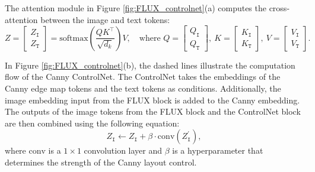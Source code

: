 \documentclass{article}
\begin{document}
The attention module in Figure \ref{fig:FLUX_controlnet}(a) computes the cross-attention between the image and text tokens:
\begin{equation}
Z = \begin{bmatrix} Z_\texttt{I}\\Z_\texttt{T}\end{bmatrix} = \mathrm{softmax}\left(\frac{Q K^\top}{\sqrt{d_k}}\right)V,\quad \text{where }
Q = \begin{bmatrix}Q_\texttt{I}\\Q_\texttt{T}\end{bmatrix},\ 
K = \begin{bmatrix}K_\texttt{I}\\K_\texttt{T}\end{bmatrix},\ 
V = \begin{bmatrix}V_\texttt{I}\\V_\texttt{T}\end{bmatrix}.\ 
\label{eq:FLUX_attention}
\end{equation}

In Figure \ref{fig:FLUX_controlnet}(b), the dashed lines illustrate the computation flow of the Canny ControlNet. The ControlNet takes the embeddings of the Canny edge map tokens and the text tokens as conditions. Additionally, the image embedding input from the FLUX block is added to the Canny embedding. The outputs of the image tokens from the FLUX block and the ControlNet block are then combined using the following equation:
\begin{equation}
Z_{\texttt{I}} \gets Z_{\texttt{I}} + \beta \cdot \mathrm{conv}(Z^{\prime}_{\texttt{I}}),
\label{eq:controlnet_add}
\end{equation}
where $\mathrm{conv}$ is a $1\times1$ convolution layer and $\beta$ is a hyperparameter that determines the strength of the Canny layout control.
\end{document}
